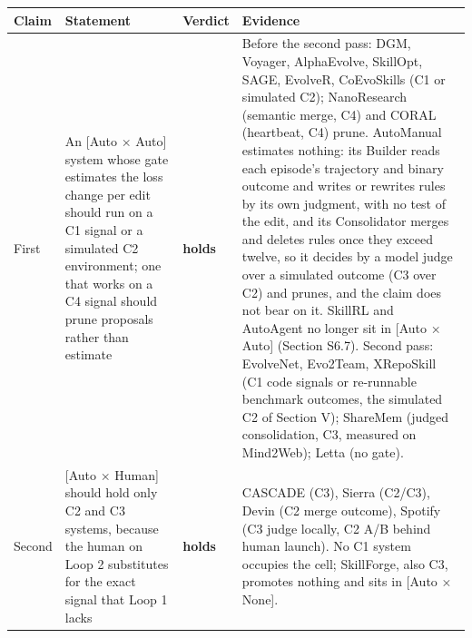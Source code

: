 \documentclass[
]{article}
\newcounter{none} %
\begin{document}
{\def\LTcaptype{none} %
\begin{longtable}[]{@{}
  >{\raggedright\arraybackslash}p{}
  >{\raggedright\arraybackslash}p{}
  >{\raggedright\arraybackslash}p{}
  >{\raggedright\arraybackslash}p{}@{}}
\toprule\noalign{}
\begin{minipage}[b]{\linewidth}\raggedright
Claim
\end{minipage} & \begin{minipage}[b]{\linewidth}\raggedright
Statement
\end{minipage} & \begin{minipage}[b]{\linewidth}\raggedright
Verdict
\end{minipage} & \begin{minipage}[b]{\linewidth}\raggedright
Evidence
\end{minipage} \\
\midrule\noalign{}
\endhead
\bottomrule\noalign{}
\endlastfoot
First & An {[}Auto × Auto{]} system whose gate estimates the loss change
per edit should run on a C1 signal or a simulated C2 environment; one
that works on a C4 signal should prune proposals rather than estimate &
\textbf{holds} & Before the second pass: DGM, Voyager, AlphaEvolve,
SkillOpt, SAGE, EvolveR, CoEvoSkills (C1 or simulated C2); NanoResearch
(semantic merge, C4) and CORAL (heartbeat, C4) prune. AutoManual
estimates nothing: its Builder reads each episode's trajectory and
binary outcome and writes or rewrites rules by its own judgment, with no
test of the edit, and its Consolidator merges and deletes rules once
they exceed twelve, so it decides by a model judge over a simulated
outcome (C3 over C2) and prunes, and the claim does not bear on it.
SkillRL and AutoAgent no longer sit in {[}Auto × Auto{]} (Section S6.7).
Second pass: EvolveNet, Evo2Team, XRepoSkill (C1 code signals or
re-runnable benchmark outcomes, the simulated C2 of Section V); ShareMem
(judged consolidation, C3, measured on Mind2Web); Letta (no gate). \\
Second & {[}Auto × Human{]} should hold only C2 and C3 systems, because
the human on Loop 2 substitutes for the exact signal that Loop 1 lacks &
\textbf{holds} & CASCADE (C3), Sierra (C2/C3), Devin (C2 merge outcome),
Spotify (C3 judge locally, C2 A/B behind human launch). No C1 system
occupies the cell; SkillForge, also C3, promotes nothing and sits in
{[}Auto × None{]}. \\

\end{longtable}}
\end{document}
